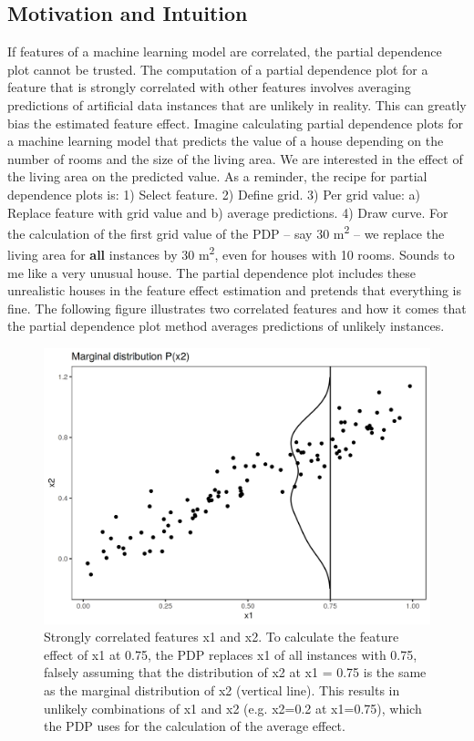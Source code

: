 \documentclass[12pt,]{krantz}
\begin{document}
\subsection{Motivation and Intuition}\label{motivation-and-intuition}

If features of a machine learning model are correlated, the partial
dependence plot cannot be trusted. The computation of a partial
dependence plot for a feature that is strongly correlated with other
features involves averaging predictions of artificial data instances
that are unlikely in reality. This can greatly bias the estimated
feature effect. Imagine calculating partial dependence plots for a
machine learning model that predicts the value of a house depending on
the number of rooms and the size of the living area. We are interested
in the effect of the living area on the predicted value. As a reminder,
the recipe for partial dependence plots is: 1) Select feature. 2) Define
grid. 3) Per grid value: a) Replace feature with grid value and b)
average predictions. 4) Draw curve. For the calculation of the first
grid value of the PDP -- say 30 m\textsuperscript{2} -- we replace the
living area for \textbf{all} instances by 30 m\textsuperscript{2}, even
for houses with 10 rooms. Sounds to me like a very unusual house. The
partial dependence plot includes these unrealistic houses in the feature
effect estimation and pretends that everything is fine. The following
figure illustrates two correlated features and how it comes that the
partial dependence plot method averages predictions of unlikely
instances.

\begin{figure}

{\centering \includegraphics[width=\textwidth]{images/aleplot-motivation1-1} 

}

\caption{Strongly correlated features x1 and x2. To calculate the feature effect of x1 at 0.75, the PDP replaces x1 of all instances with 0.75, falsely assuming that the distribution of x2 at x1 = 0.75 is the same as the marginal distribution of x2 (vertical line). This results in unlikely combinations of x1 and x2 (e.g. x2=0.2 at x1=0.75), which the PDP uses for the calculation of the average effect.}\label{fig:aleplot-motivation1}
\end{figure}
\end{document}

